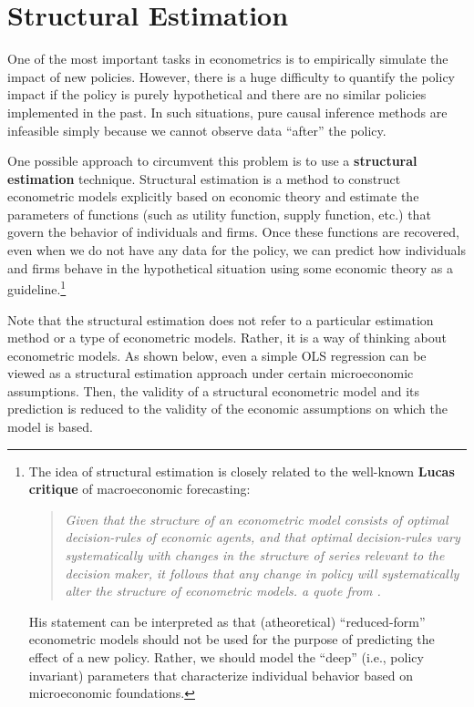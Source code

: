 \documentclass[11pt, A4paper, openany, uplatex]{book}
\begin{document}
\chapter{Structural Estimation}

One of the most important tasks in econometrics is to empirically simulate the impact of new policies.
However, there is a huge difficulty to quantify the policy impact if the policy is purely hypothetical and there are no similar policies implemented in the past.
In such situations, pure causal inference methods are infeasible simply because we cannot observe data ``after'' the policy.

One possible approach to circumvent this problem is to use a \textbf{structural estimation} technique.
Structural estimation is a method to construct econometric models explicitly based on economic theory and  estimate the parameters of functions (such as utility function, supply function, etc.) that govern the behavior of individuals and firms.
Once these functions are recovered, even when we do not have any data for the policy, we can predict how individuals and firms behave in the hypothetical situation using some economic theory as a guideline.\footnote{
	The idea of structural estimation is closely related to the well-known \textbf{Lucas critique} of macroeconomic forecasting:
	\begin{quote}\it
		Given that the structure of an econometric model consists of optimal decision-rules of economic agents, and that optimal decision-rules vary systematically with changes in the structure of series relevant to the decision maker, it follows that any change in policy will systematically alter the structure of econometric models. \upshape a quote from \cite{LUCAS197619}.
	\end{quote}
	His statement can be interpreted as that (atheoretical) ``reduced-form'' econometric models should not be used for the purpose of predicting the effect of a new policy.
	Rather, we should model the ``deep'' (i.e., policy invariant) parameters that characterize individual behavior based on microeconomic foundations.
	}

Note that the structural estimation does not refer to a particular estimation method or a type of econometric models.
Rather, it is a way of thinking about econometric models.
As shown below, even a simple OLS regression can be viewed as a structural estimation approach under certain microeconomic assumptions.
Then, the validity of a structural econometric model and its prediction is reduced to the validity of the economic assumptions on which the model is based.
\end{document}
